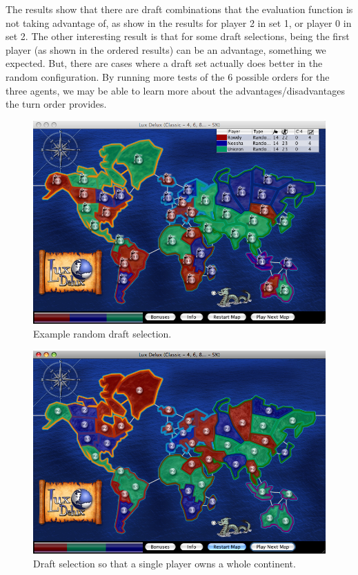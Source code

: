 \documentclass[letterpaper]{article}
\numberwithin{equation}{section}
\numberwithin{theorem}{section}
\numberwithin{lemma}{section}
\numberwithin{df}{section}
\begin{document}
The results show that there are draft combinations that the evaluation function is not taking advantage of, as show in the results for player 2 in set 1, or player 0 in set 2. The other interesting result is that for some draft selections, being the first player (as shown in the ordered results) can be an advantage, something we expected. But, there are cases where a draft set actually does better in the random configuration. By running more tests of the 6 possible orders for the three agents, we may be able to learn more about the advantages/disadvantages the turn order provides. 

\begin{figure}[htp]
\centering
\includegraphics[scale=0.3]{testmap2.png}
\caption{Example random draft selection.}\label{fig:random}
\end{figure}

\begin{figure}[htp]
\centering
\includegraphics[scale=0.3]{testmapcontinent.png}
\caption{Draft selection so that a single player owns a whole continent.}\label{fig:continent}
\end{figure}
\end{document}

